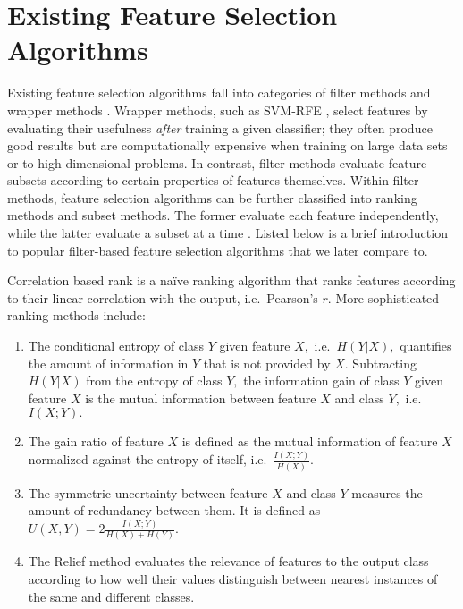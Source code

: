 \section{Existing Feature Selection Algorithms}

Existing feature selection algorithms fall into categories of filter
methods and wrapper methods \cite{guyon_jmlr03}. Wrapper methods, such
as SVM-RFE \cite{guyon2002gene}, select features by evaluating their
usefulness \emph{after} training a given classifier; they often
produce good results but are computationally expensive when training
on large data sets or to high-dimensional problems.  In contrast,
filter methods evaluate feature subsets according to certain
properties of features themselves.  Within filter methods, feature
selection algorithms can be further classified into ranking methods
and subset methods. The former evaluate each feature independently,
while the latter evaluate a subset at a time
\cite{brown2012conditional}. Listed below is a brief introduction to
popular filter-based feature selection algorithms that we later
compare to.

Correlation based rank is a na\"{i}ve ranking algorithm that ranks
features according to their linear correlation with the output,
i.e.\ Pearson's $r.$ More sophisticated ranking methods include:
\begin{enumerate}
\item The conditional entropy of class $Y$ given feature $X,$
  i.e.\ $H\left(Y|X\right),$ quantifies the amount of information in
  $Y$ that is not provided by $X.$ Subtracting $H\left(Y|X\right)$
  from the entropy of class $Y,$ the information gain of class $Y$
  given feature $X$ is the mutual information between feature $X$ and
  class $Y,$ i.e.\ $I\left(X;Y\right).$
\item The gain ratio of feature $X$ is defined as the mutual information
  of feature $X$ normalized against the entropy of itself,
  i.e.\ $\frac{I\left(X;Y\right)}{H\left(X\right)}.$
\item The symmetric uncertainty between feature $X$ and class $Y$
  measures the amount of redundancy between them. It is defined as
  $U\left(X,Y\right)=2\frac{I\left(X;Y\right)}{H\left(X\right)+H\left(Y\right)}.$
\item The Relief method \cite{kira1992feature} evaluates the relevance
  of features to the output class according to how well their values
  distinguish between nearest instances of the same and different
  classes.
\end{enumerate}

